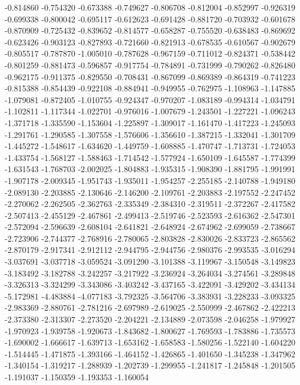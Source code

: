 -0.814860
-0.754320
-0.673388
-0.749627
-0.806708
-0.812004
-0.852997
-0.926319
-0.699338
-0.800042
-0.695117
-0.612623
-0.691428
-0.881720
-0.703932
-0.601678
-0.870909
-0.725432
-0.839652
-0.814577
-0.658287
-0.755520
-0.638483
-0.869692
-0.623426
-0.903123
-0.827893
-0.721660
-0.821913
-0.678535
-0.610567
-0.902679
-0.805517
-0.787870
-1.005010
-0.787628
-0.967159
-0.711012
-0.824371
-0.538442
-0.801259
-0.881473
-0.596857
-0.917754
-0.784891
-0.731999
-0.790262
-0.826480
-0.962175
-0.911375
-0.829550
-0.708431
-0.867099
-0.869389
-0.864319
-0.741223
-0.815388
-0.854439
-0.922108
-0.884941
-0.949955
-0.762975
-1.108963
-1.147885
-1.079081
-0.872405
-1.010755
-0.924347
-0.970207
-1.083189
-0.994314
-1.034791
-1.102811
-1.117344
-1.022701
-0.976016
-1.007679
-1.243501
-1.227221
-1.096243
-1.371718
-1.335590
-1.153604
-1.225897
-1.309017
-1.161470
-1.417223
-1.245093
-1.291761
-1.290585
-1.307558
-1.576606
-1.356610
-1.387215
-1.332041
-1.301709
-1.445272
-1.548617
-1.634620
-1.449759
-1.608885
-1.470747
-1.713731
-1.724053
-1.433754
-1.568127
-1.588463
-1.714542
-1.577924
-1.650109
-1.645587
-1.774399
-1.631543
-1.768703
-2.002025
-1.804883
-1.935315
-1.908390
-1.881795
-1.991991
-1.907178
-2.009345
-1.951743
-1.935011
-1.954257
-2.255185
-2.140788
-1.949180
-2.089130
-2.203885
-2.130646
-2.146200
-2.109761
-2.203883
-2.197552
-2.247452
-2.270062
-2.262505
-2.362763
-2.335349
-2.384310
-2.319511
-2.372267
-2.417582
-2.507413
-2.455129
-2.467861
-2.499413
-2.519746
-2.523593
-2.616362
-2.547301
-2.572094
-2.596639
-2.608104
-2.641821
-2.648924
-2.674962
-2.699059
-2.738667
-2.723906
-2.744377
-2.768916
-2.780065
-2.803828
-2.830026
-2.833723
-2.865562
-2.870179
-2.917341
-2.912112
-2.944795
-2.944756
-2.980376
-2.993535
-3.016294
-3.037691
-3.037718
-3.059524
-3.091290
-3.101388
-3.119967
-3.150548
-3.149823
-3.183492
-3.182788
-3.242257
-3.217922
-3.236924
-3.264034
-3.274561
-3.289848
-3.326313
-3.324299
-3.343086
-3.403242
-3.437165
-3.422091
-3.429202
-3.434134
-5.172981
-4.483884
-4.077183
-3.792325
-3.564706
-3.383931
-3.228233
-3.093325
-2.983369
-2.880761
-2.781216
-2.697989
-2.619025
-2.550999
-2.467862
-2.422213
-2.373380
-2.313307
-2.273520
-2.204221
-2.134889
-2.073598
-2.046258
-1.979927
-1.970923
-1.939758
-1.920673
-1.843682
-1.800627
-1.769593
-1.783886
-1.735573
-1.690002
-1.666617
-1.639713
-1.653162
-1.658583
-1.580256
-1.522140
-1.604220
-1.514445
-1.471875
-1.393166
-1.464152
-1.426865
-1.401650
-1.345238
-1.347962
-1.340154
-1.319217
-1.288939
-1.202739
-1.299955
-1.241817
-1.245848
-1.201505
-1.191037
-1.150359
-1.193353
-1.160054
